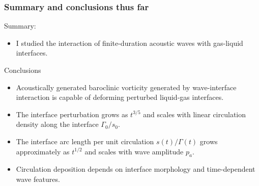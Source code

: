 \begin{frame} \frametitle{\vspace*{0.5cm}Summary and conclusions thus far}
  \small
  Summary:
  \begin{itemize}
  \item I studied the interaction of finite-duration acoustic waves with gas-liquid interfaces.
  \end{itemize}
  \vspace*{0.25cm}
  Conclusions
  \begin{itemize}
  \item Acoustically generated baroclinic vorticity generated by wave-interface interaction is capable of deforming perturbed liquid-gas interfaces.%
  \item The interface perturbation grows as $t^{3/5}$ and scales with linear circulation density along the interface $\Gamma_0 / s_0$.
  \item The interface arc length per unit circulation $s(t)/\Gamma(t)$ grows approximately as $t^{1/2}$ and scales with wave amplitude $p_a$.
  \item Circulation deposition depends on interface morphology and time-dependent wave features.
  \end{itemize}
\end{frame}
